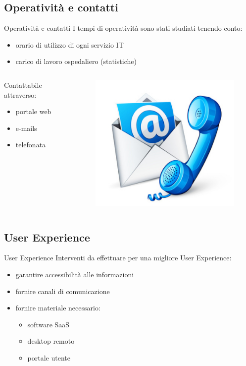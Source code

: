 \subsection{Operatività e contatti}
\begin{frame}{Operatività e contatti}
I tempi di operatività sono stati studiati tenendo conto:
\begin{itemize}
\item{orario di utilizzo di ogni servizio IT}
\item{carico di lavoro ospedaliero (statistiche)}
\end{itemize}
\begin{columns}
\begin{column}{0.7\textwidth}
Contattabile attraverso:
\begin{itemize}
\item{portale web}
\item{e-mails}
\item{telefonata}
\end{itemize}
\end{column}
\begin{column}{0.3\textwidth}
\begin{figure}
\includegraphics[scale=0.2]{Images/Contact.png}
\end{figure}
\end{column}
\end{columns}
\end{frame}

\subsection{User Experience}
\begin{frame}{User Experience}
Interventi da effettuare per una migliore User Experience:
\begin{itemize}
\item{garantire accessibilità alle informazioni}
\item{fornire canali di comunicazione}
\item{fornire materiale necessario:}
\begin{itemize}
\item{software SaaS}
\item{desktop remoto}
\item{portale utente}
\end{itemize}
\end{itemize}
\end{frame}

